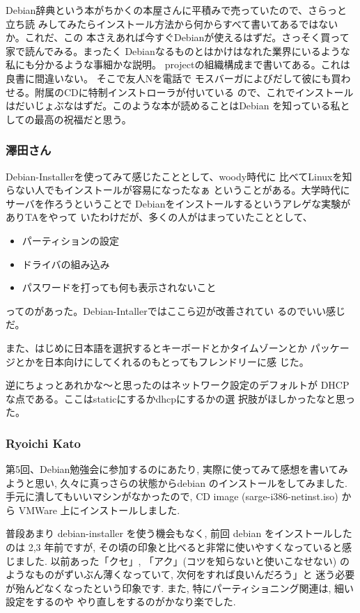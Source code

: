 \documentclass[mingoth]{jsarticle}
\begin{document}
 Debian辞典という本がちかくの本屋さんに平積みで売っていたので、さらっと立ち読
みしてみたらインストール方法から何からすべて書いてあるではないか。これだ、この
本さえあれば今すぐDebianが使えるはずだ。さっそく買って家で読んでみる。まったく
Debianなるものとはかけはなれた業界にいるような私にも分かるような事細かな説明。
projectの組織構成まで書いてある。これは良書に間違いない。 そこで友人Nを電話で
モスバーガによびだして彼にも買わせる。附属のCDに特制インストローラが付いている
ので、これでインストールはだいじょぶなはずだ。このような本が読めることはDebian
を知っている私としての最高の祝福だと思う。

\subsubsection{澤田さん}
Debian-Installerを使ってみて感じたこととして、woody時代に 
比べてLinuxを知らない人でもインストールが容易になったなぁ 
ということがある。大学時代にサーバを作ろうということで 
Debianをインストールするというアレゲな実験がありTAをやって 
いたわけだが、多くの人がはまっていたこととして、


\begin{itemize}
 \item  パーティションの設定
 \item  ドライバの組み込み
 \item  パスワードを打っても何も表示されないこと
\end{itemize}

ってのがあった。Debian-Intallerではここら辺が改善されてい 
るのでいい感じだ。

また、はじめに日本語を選択するとキーボードとかタイムゾーンとか 
パッケージとかを日本向けにしてくれるのもとってもフレンドリーに感 
じた。

逆にちょっとあれかな〜と思ったのはネットワーク設定のデフォルトが 
DHCPな点である。ここはstaticにするかdhcpにするかの選 
択肢がほしかったなと思った。



\subsubsection{Ryoichi Kato}
第5回、Debian勉強会に参加するのにあたり,
実際に使ってみて感想を書いてみようと思い,
久々に真っさらの状態からdebian のインストールをしてみました. 
手元に潰してもいいマシンがなかったので,
CD image (sarge-i386-netinst.iso) から
VMWare 上にインストールしました.

普段あまり debian-installer を使う機会もなく,
前回 debian をインストールしたのは 2,3 年前ですが,
その頃の印象と比べると非常に使いやすくなっていると感じました.
以前あった「クセ」, 「アク」(コツを知らないと使いこなせない)
のようなものがずいぶん薄くなっていて, 次何をすれば良いんだろう」と
迷う必要が殆んどなくなったという印象です.
また, 特にパーティショニング関連は, 細い設定をするのや
やり直しをするのがかなり楽でした.
\end{document}
